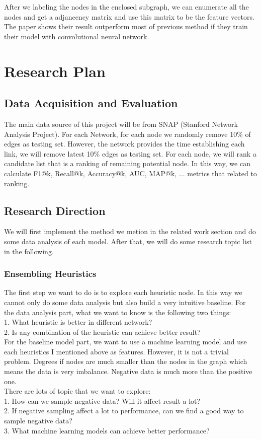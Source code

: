 \documentclass[paper=letter, fontsize=12pt]{scrartcl} %
\begin{document}
After we labeling the nodes in the enclosed subgraph, we can enumerate all the nodes and get a adjancency matrix and use this matrix to be the feature vectors. The paper shows their result outperform most of previous method if they train their model with convolutional neural network.


\section{Research Plan}

\subsection{Data Acquisition and Evaluation}
The main data source of this project will be from SNAP (Stanford Network Analysis Project).
For each Network,  for each node we randomly remove 10\% of edges as testing set. However, the network provides the time establishing each link, we will remove latest 10\% edges as testing set. For each node, we will rank a candidate list that is a ranking of remaining potential node. In this way, we can calculate F1@k, Recall@k, Accuracy@k, AUC, MAP@k, ... metrics that related to ranking. 

\subsection {Research Direction}
We will first implement the method we metion in the related work section and do some data analysis of each model. After that, we will do some research topic list in the following. 

\subsubsection {Ensembling Heuristics}
The first step we want to do is to explore each heuristic node. In this way we cannot only do some data analysis but also build a very intuitive baseline. 
For the data analysis part, what we want to know is the following two things: \\
1. What heuristic is better in different network? \\
2. Is any combination of the heuristic can achieve better result? \\

For the baseline model part, we want to use a machine learning model and use each heuristics I mentioned above as features. However, it is not a trivial problem. Degrees if nodes are much smaller than the nodes in the graph which means the data is very imbalance. Negative data is much more than the positive one.\\
There are lots of topic that we want to explore: \\
1. How can we sample negative data? Will it affect result a lot? \\
2. If negative sampling affect a lot to performance, can we find a good way to sample negative data? \\
3. What machine learning models can achieve better performance? \\
\end{document}
